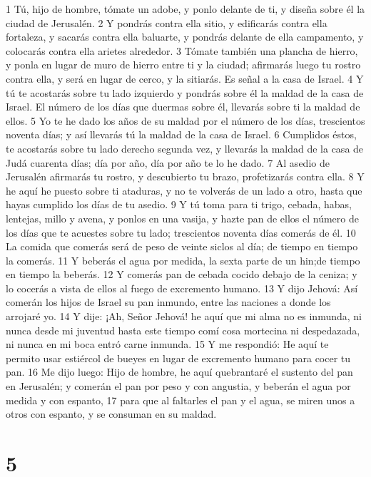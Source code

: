 1 Tú, hijo de hombre, tómate un adobe, y ponlo delante de ti, y diseña sobre él la ciudad de Jerusalén.
2 Y pondrás contra ella sitio, y edificarás contra ella fortaleza, y sacarás contra ella baluarte, y pondrás delante de ella campamento, y colocarás contra ella arietes alrededor.
3 Tómate también una plancha de hierro, y ponla en lugar de muro de hierro entre ti y la ciudad; afirmarás luego tu rostro contra ella, y será en lugar de cerco, y la sitiarás. Es señal a la casa de Israel.
4 Y tú te acostarás sobre tu lado izquierdo y pondrás sobre él la maldad de la casa de Israel. El número de los días que duermas sobre él, llevarás sobre ti la maldad de ellos.
5 Yo te he dado los años de su maldad por el número de los días, trescientos noventa días; y así llevarás tú la maldad de la casa de Israel.
6 Cumplidos éstos, te acostarás sobre tu lado derecho segunda vez, y llevarás la maldad de la casa de Judá cuarenta días; día por año, día por año te lo he dado.
7 Al asedio de Jerusalén afirmarás tu rostro, y descubierto tu brazo, profetizarás contra ella.
8 Y he aquí he puesto sobre ti ataduras, y no te volverás de un lado a otro, hasta que hayas cumplido los días de tu asedio.
9 Y tú toma para ti trigo, cebada, habas, lentejas, millo y avena, y ponlos en una vasija, y hazte pan de ellos el número de los días que te acuestes sobre tu lado; trescientos noventa días comerás de él.
10 La comida que comerás será de peso de veinte siclos al día; de tiempo en tiempo la comerás.
11 Y beberás el agua por medida, la sexta parte de un hin;de tiempo en tiempo la beberás.
12 Y comerás pan de cebada cocido debajo de la ceniza; y lo cocerás a vista de ellos al fuego de excremento humano.
13 Y dijo Jehová: Así comerán los hijos de Israel su pan inmundo, entre las naciones a donde los arrojaré yo.
14 Y dije: ¡Ah, Señor Jehová! he aquí que mi alma no es inmunda, ni nunca desde mi juventud hasta este tiempo comí cosa mortecina ni despedazada, ni nunca en mi boca entró carne inmunda.
15 Y me respondió: He aquí te permito usar estiércol de bueyes en lugar de excremento humano para cocer tu pan.
16 Me dijo luego: Hijo de hombre, he aquí quebrantaré el sustento del pan en Jerusalén; y comerán el pan por peso y con angustia, y beberán el agua por medida y con espanto,
17 para que al faltarles el pan y el agua, se miren unos a otros con espanto, y se consuman en su maldad.

\chapter{5}

